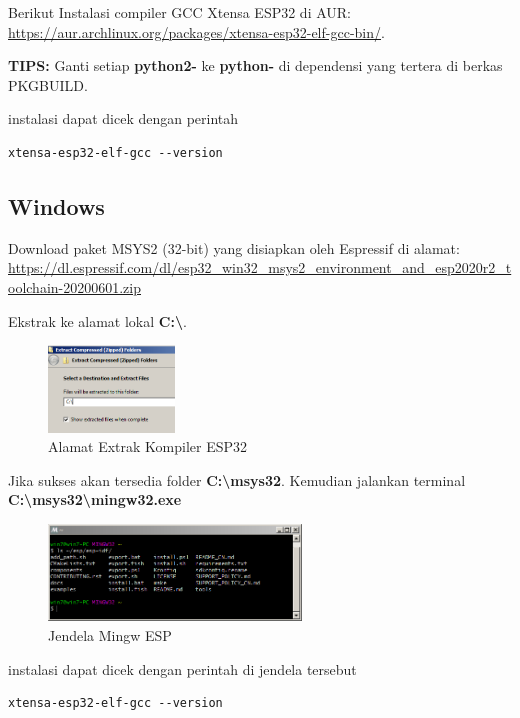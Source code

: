 \documentclass[12pt]{book}
\begin{document}
	Berikut Instalasi compiler GCC Xtensa ESP32 di AUR: \url{https://aur.archlinux.org/packages/xtensa-esp32-elf-gcc-bin/}.
	
	\textbf{TIPS:} Ganti setiap \textbf{python2-} ke \textbf{python-} di dependensi yang tertera di berkas PKGBUILD.
	
	instalasi dapat dicek dengan perintah
	\begin{verbatim}
xtensa-esp32-elf-gcc --version
	\end{verbatim}
	
	\subsection{Windows}
	
	Download paket MSYS2 (32-bit) yang disiapkan oleh Espressif di alamat: \url{https://dl.espressif.com/dl/esp32_win32_msys2_environment_and_esp2020r2_toolchain-20200601.zip}
	
	Ekstrak ke alamat lokal \textbf{C:\textbackslash}.
		
	\begin{figure}[!ht]
		\centering
		\includegraphics[width=0.3\textwidth]{images/esp/esp32win}
		\caption{Alamat Extrak Kompiler ESP32}
	\end{figure}
	
	Jika sukses akan tersedia folder \textbf{C:\textbackslash msys32}.
	Kemudian jalankan terminal \textbf{C:\textbackslash msys32\textbackslash mingw32.exe}
	
	\newpage
	\begin{figure}[!ht]
		\centering
		\includegraphics[width=0.6\textwidth]{images/esp/esp32mingw}
		\caption{Jendela Mingw ESP}
	\end{figure}
	
	instalasi dapat dicek dengan perintah di jendela tersebut
	\begin{verbatim}
xtensa-esp32-elf-gcc --version
	\end{verbatim}
	
\end{document}
